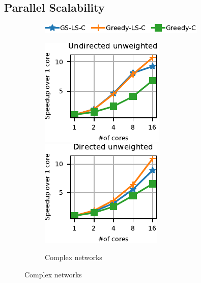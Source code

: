 \subsection{Parallel Scalability}
%
\begin{figure}[tb]
\centering
\begin{subfigure}[t]{\textwidth}
\centering
\includegraphics{./sources/plots/gh-gc-apx/legend-par-speedup.pdf}
\end{subfigure}\smallskip

\begin{subfigure}[t]{\textwidth}
\centering
\includegraphics[width=.24\textwidth]{./sources/plots/gh-gc-apx/par-speedup-small-diameter-undirected-unweighted.pdf}
\includegraphics[width=.24\textwidth]{./sources/plots/gh-gc-apx/par-speedup-small-diameter-directed-unweighted.pdf}
\caption{Complex networks}
\end{subfigure}\medskip


\end{figure}
